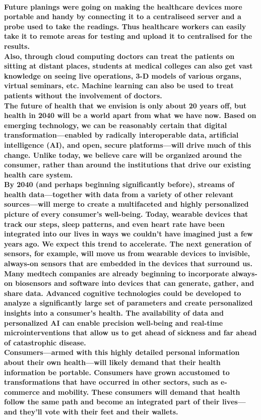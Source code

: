\documentclass[12pt]{article}
\begin{document}
    \paragraph{Future planings were going on making the healthcare devices more portable and handy by connecting it to a centraliseed server and a probe used to take the readings. Thus healthcare workers can easily take it to remote areas for testing and upload it to centralised for the results.\\
    Also, through cloud computing doctors can treat the patients on sitting at distant places, students at medical colleges can also get vast knowledge on seeing live operations, 3-D models of various organs, virtual seminars, etc. Machine learning can also be used to treat patients without the involvement of doctors.\\
    The future of health that we envision is only about 20 years off, but health in 2040 will be a world apart from what we have now. Based on emerging technology, we can be reasonably certain that digital transformation—enabled by radically interoperable data, artificial intelligence (AI), and open, secure platforms—will drive much of this change. Unlike today, we believe care will be organized around the consumer, rather than around the institutions that drive our existing health care system.\\
    
    By 2040 (and perhaps beginning significantly before), streams of health data—together with data from a variety of other relevant sources—will merge to create a multifaceted and highly personalized picture of every consumer’s well-being. Today, wearable devices that track our steps, sleep patterns, and even heart rate have been integrated into our lives in ways we couldn’t have imagined just a few years ago. We expect this trend to accelerate. The next generation of sensors, for example, will move us from wearable devices to invisible, always-on sensors that are embedded in the devices that surround us.\\
    
    Many medtech companies are already beginning to incorporate always-on biosensors and software into devices that can generate, gather, and share data. Advanced cognitive technologies could be developed to analyze a significantly large set of parameters and create personalized insights into a consumer’s health. The availability of data and personalized AI can enable precision well-being and real-time microinterventions that allow us to get ahead of sickness and far ahead of catastrophic disease.\\
    
    Consumers—armed with this highly detailed personal information about their own health—will likely demand that their health information be portable. Consumers have grown accustomed to transformations that have occurred in other sectors, such as e-commerce and mobility. These consumers will demand that health follow the same path and become an integrated part of their lives—and they’ll vote with their feet and their wallets.  }
\end{document}
